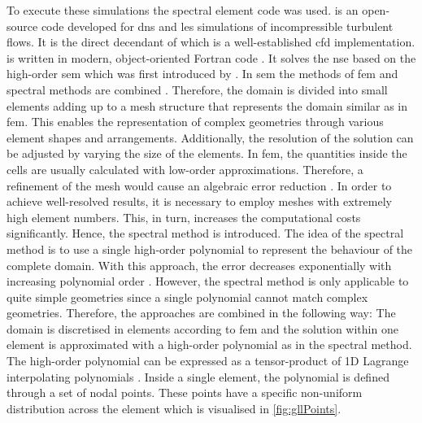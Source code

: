 To execute these simulations the spectral element code  was used. 
 is an open-source code developed for \acrshort{dns} and \acrshort{les} simulations of incompressible turbulent flows.
It is the direct decendant of  which is a well-established \acrfull{cfd} implementation.
 is written in modern, object-oriented Fortran code \citep{jansson_neko_2024}.
It solves the \acrshort{nse} based on the high-order \acrfull{sem} which was first introduced by \citet{patera_spectral_1984}.
In \acrshort{sem} the methods of \acrshort{fem} and spectral methods are combined \citep{patera_spectral_1984}.
Therefore, the domain is divided into small elements adding up to a mesh structure that represents the domain similar as in \acrshort{fem}.
This enables the representation of complex geometries through various element shapes and arrangements.
Additionally, the resolution of the solution can be adjusted by varying the size of the elements.
In \acrshort{fem}, the quantities inside the cells are  usually calculated with low-order approximations.
Therefore, a refinement of the mesh would cause an algebraic error reduction \citep{deville_high-order_2002}. 
In order to achieve well-resolved results, it is necessary to employ meshes with extremely high element numbers. This, in turn, increases the  computational costs significantly.
Hence, the spectral method is introduced.
The idea of the spectral method is to use a single high-order polynomial to represent the behaviour of the complete domain.
With this approach, the error decreases exponentially with increasing polynomial order \citep{deville_high-order_2002}.
However, the spectral method is only applicable to quite simple geometries since a single polynomial cannot match complex geometries.
Therefore, the approaches are combined in the following way:
The domain is discretised in elements according to \acrshort{fem} and the solution within one element is approximated with a high-order polynomial as in the spectral method.
The high-order polynomial can be expressed as a tensor-product of 1D Lagrange interpolating polynomials \citep{deville_high-order_2002}.
Inside a single element, the polynomial is defined through a set of nodal points.
These  points have a specific non-uniform distribution across the element which is visualised in \autoref{fig:gllPoints}.
